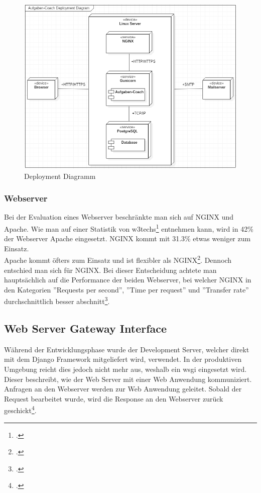 \begin{figure}[H]
\begin{center}
	\includegraphics[width=\textwidth, keepaspectratio]{images/deployment_diagram.png}
	\caption{Deployment Diagramm}
	\label{fig:deployment_diagram}
\end{center}
\end{figure}

\subsubsection*{Webserver}
Bei der Evaluation eines Webserver beschränkte man sich auf NGINX und Apache. Wie man auf einer Statistik von w3techs\footcite{webserver_usage} entnehmen kann, wird in 42\% der Webserver Apache eingesetzt. NGINX kommt mit 31.3\% etwas weniger zum Einsatz. \\

Apache kommt öfters zum Einsatz und ist flexibler als NGINX\footcite{webserver_comparison}. Dennoch entschied man sich für NGINX. Bei dieser Entscheidung achtete man hauptsächlich auf die Performance der beiden Webserver, bei welcher NGINX in den Kategorien ''Requests per second'', ''Time per request'' und ''Transfer rate'' durchschnittlich besser abschnitt\footcite{webserver_performance}.

\subsection*{Web Server Gateway Interface}
Während der Entwicklungsphase wurde der Development Server, welcher direkt mit dem Django Framework mitgeliefert wird, verwendet. In der produktiven Umgebung reicht dies jedoch nicht mehr aus, weshalb ein \gls{wsgi} eingesetzt wird. Dieser beschreibt, wie der Web Server mit einer Web Anwendung kommuniziert. Anfragen an den Webserver werden zur Web Anwendung geleitet. Sobald der Request bearbeitet wurde, wird die Response an den Webserver zurück geschickt\footcite{wsgi_description}.

